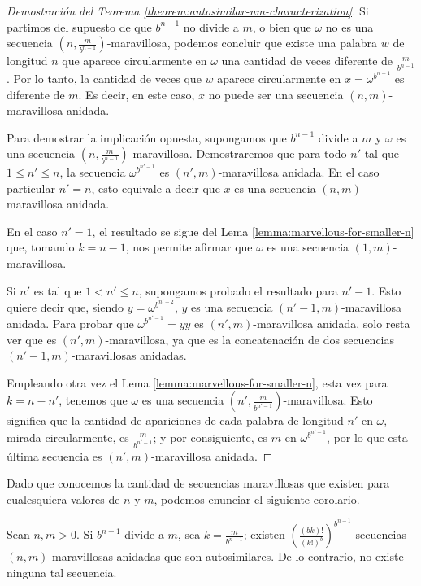 \begin{proof}[Demostración del Teorema \ref{theorem:autosimilar-nm-characterization}]
	Si partimos del supuesto de que $b^{n-1}$ no divide a $m$, o bien que
	$\omega$ no es una secuencia $\left( n, \frac{m}{b^{n-1}}
		\right)$-maravillosa,
	podemos concluir que existe una palabra $w$ de longitud $n$ que aparece
	circularmente en $\omega$ una cantidad de veces diferente de
	$\frac{m}{b^{n-1}}$.
	Por lo tanto, la cantidad de veces que $w$ aparece circularmente
	en $x = \omega^{b^{n-1}}$ es diferente de $m$.
	Es decir, en este caso, $x$ no puede ser una secuencia $(n,m)$-maravillosa
	anidada.

	Para demostrar la implicación opuesta, supongamos que $b^{n-1}$ divide a $m$
	y $\omega$ es una secuencia $\left(n, \frac{m}{b^{n-1}} \right)$-maravillosa.
	Demostraremos que para todo $n'$ tal que $1 \leq n' \leq n$, la secuencia
	$\omega^{b^{n'-1}}$ es $(n',m)$-maravillosa anidada.
	En el caso particular $n' = n$, esto equivale a decir que $x$ es una secuencia
	$(n,m)$-maravillosa anidada.

	En el caso $n' = 1$, el resultado se sigue del Lema
	\ref{lemma:marvellous-for-smaller-n} que, tomando $k = n-1$, nos permite
	afirmar que $\omega$ es una secuencia $(1,m)$-maravillosa.

	Si $n'$ es tal que $1 < n' \leq n$, supongamos probado el resultado para
	$n'-1$.
	Esto quiere decir que, siendo $y = \omega^{b^{n' - 2}}$, $y$ es una secuencia
	$(n'-1, m)$-maravillosa anidada.
	Para probar que $\omega^{b^{n' - 1}} = yy$ es $(n',m)$-maravillosa anidada,
	solo resta ver que es $(n',m)$-maravillosa, ya que es la concatenación de dos
	secuencias $(n'-1, m)$-maravillosas anidadas.

	Empleando otra vez el Lema \ref{lemma:marvellous-for-smaller-n}, esta vez para
	$k = n - n'$, tenemos que $\omega$ es una secuencia $\left( n', \frac{m}{b^{n'
				- 1}} \right)$-maravillosa.
	Esto significa que la cantidad de apariciones de cada palabra de longitud $n'$
	en $\omega$, mirada circularmente, es $\frac{m}{b^{n' - 1}}$; y por
	consiguiente, es $m$ en $\omega^{b^{n'-1}}$, por lo que esta última secuencia
	es $(n',m)$-maravillosa anidada.
\end{proof}

Dado que conocemos la cantidad de secuencias maravillosas que existen para
cualesquiera valores de $n$ y $m$, podemos enunciar el siguiente corolario.

\begin{corollary} \label{corollary:autosimilar-nm-count}
	Sean $n, m > 0$.
	Si $b^{n-1}$ divide a $m$, sea $k = \frac{m}{b^{n-1}}$; existen
	$\left( \frac{(bk)! }{(k!)^b} \right)^{b^{n-1}}$
	secuencias $(n,m)$-maravillosas anidadas que son autosimilares.
	De lo contrario, no existe ninguna tal secuencia.
\end{corollary}

